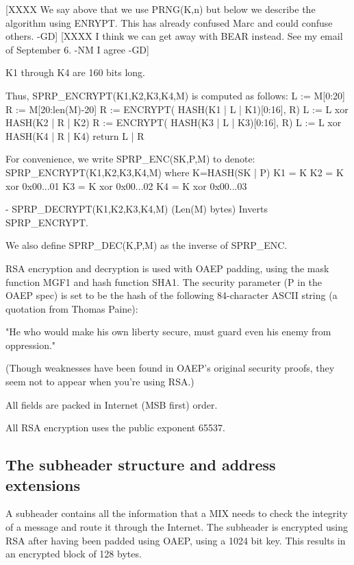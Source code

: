   [XXXX We say above that we use PRNG(K,n) but below we describe the 
	algorithm using ENRYPT. This has already confused Marc and could
	confuse others. -GD]
  [XXXX I think we can get away with BEAR instead.  See my email of
    September 6. -NM I agree -GD]

  K1 through K4 are 160 bits long.

  Thus, SPRP_ENCRYPT(K1,K2,K3,K4,M) is computed as follows:
            L := M[0:20]
            R := M[20:len(M)-20]
            R := ENCRYPT( HASH(K1 | L | K1)[0:16], R)
            L := L xor HASH(K2 | R | K2)
            R := ENCRYPT( HASH(K3 | L | K3)[0:16], R)
            L := L xor HASH(K4 | R | K4) 
            return L | R

  For convenience, we write SPRP_ENC(SK,P,M) to denote:
       SPRP_ENCRYPT(K1,K2,K3,K4,M)
       where K=HASH(SK | P)
             K1 = K
             K2 = K xor 0x00...01
             K3 = K xor 0x00...02
             K4 = K xor 0x00...03

- SPRP_DECRYPT(K1,K2,K3,K4,M) (Len(M) bytes) Inverts SPRP_ENCRYPT.

  We also define SPRP_DEC(K,P,M) as the inverse of SPRP_ENC.

RSA encryption and decryption is used with OAEP padding, using the
mask function MGF1 and hash function SHA1.  The security parameter (P
in the OAEP spec) is set to be the hash of the following 84-character
ASCII string (a quotation from Thomas Paine):

     "He who would make his own liberty secure, must guard even his
      enemy from oppression." 

(Though weaknesses have been found in OAEP's original security proofs,
they seem not to appear when you're using RSA.)

All fields are packed in Internet (MSB first) order.

All RSA encryption uses the public exponent 65537.

\subsection{The subheader structure and address extensions}

A subheader contains all the information that a MIX needs to check the
integrity of a message and route it through the Internet. The subheader
is encrypted using RSA after having been padded using OAEP, using a 1024
bit key. This results in an encrypted block of 128 bytes.

